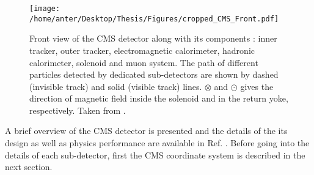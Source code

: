 \begin{figure}[!h]
\begin{center} 
\hspace*{-15mm}
\vspace{4mm}
\texttt{[image: /home/anter/Desktop/Thesis/Figures/cropped\_CMS\_Front.pdf]}
\vspace{3mm}
\caption[Front view of the CMS detector along with its various components.]{Front view of the CMS detector along with its components : inner tracker, outer tracker, electromagnetic calorimeter, hadronic calorimeter, solenoid and muon system. The path of different particles detected by dedicated sub-detectors are shown by dashed (invisible track) and solid (visible track) lines. $\otimes$ and $\odot$ gives the direction of magnetic field inside the solenoid and in the return yoke, respectively. Taken from \cite{Ball:2007zza}.}
\label{fig:CMS_front}
\end{center}
\end{figure}
A brief overview of the CMS detector is presented and the details of the its design as well as physics performance are available in Ref. \cite{Bayatian:2006nff,Ball:2007zza}. Before going into the details of each sub-detector, first the CMS coordinate system is described in the next section.
\vspace{1mm}
